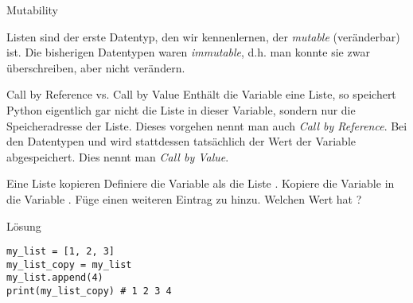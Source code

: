 \begin{frame}
\begin{block}{Mutability}

\vspace{2pt}
Listen sind der erste Datentyp, den wir kennenlernen, der \emph{mutable} (veränderbar) ist. Die bisherigen Datentypen waren \emph{immutable}, d.h. man konnte sie zwar überschreiben, aber nicht verändern. 
\end{block}

\pause 
\vspace{12pt}

\begin{block}{Call by Reference vs. Call by Value}
\vspace{2pt}
Enthält die Variable  eine Liste, so speichert Python eigentlich gar nicht die Liste in dieser Variable, sondern nur die Speicheradresse der Liste. 
Dieses vorgehen nennt man auch \emph{Call by Reference}. Bei den Datentypen  und  wird stattdessen tatsächlich der Wert der Variable abgespeichert. Dies nennt man \emph{Call by Value}.

\end{block}
\end{frame}

\begin{fragile}[Übung]
\begin{block}{Eine Liste kopieren}
\vspace{2pt}
Definiere die Variable  als die Liste \py{[1,2,3]}. Kopiere die Variable  in die Variable . Füge einen weiteren Eintrag zu  hinzu. Welchen Wert hat ? 
\end{block}
\vspace{12pt}
\begin{solutionblock}{Lösung}
\begin{verbatim}
my_list = [1, 2, 3]
my_list_copy = my_list
my_list.append(4)
print(my_list_copy) # 1 2 3 4 
\end{verbatim}
\end{solutionblock}
\end{fragile}



